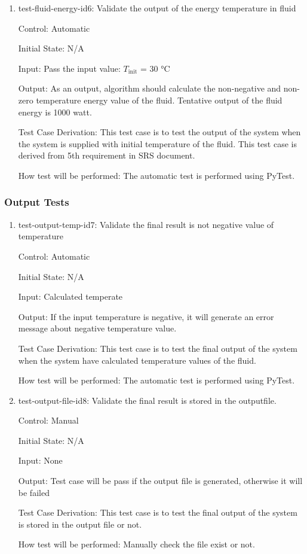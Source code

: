 \documentclass[12pt, titlepage]{article}
\begin{document}
\begin{enumerate}
\item{test-fluid-energy-id6: Validate the output of the energy temperature in fluid  \\}

Control: Automatic 
					
Initial State: N/A
					
Input: Pass the input value: $T_\text{init}$ = 30 \si[per-mode=symbol]{\celsius} 
					
Output: As an output, algorithm should calculate the non-negative and non-zero temperature energy value of the fluid. Tentative output of the fluid energy is 1000 watt.   

Test Case Derivation: This test case is to test the output of the system when the system is supplied with initial temperature of the fluid. This test case is derived from 5th requirement in SRS document.  
					
How test will be performed: The automatic test is performed using PyTest.  

\end{enumerate}   

\subsubsection{Output Tests}
\label{output_functional_tests}
\begin{enumerate}

\item{test-output-temp-id7: Validate the final result is not negative value of temperature \\}

Control: Automatic 

Initial State: N/A 

Input: Calculated temperate

Output: If the input temperature is negative, it will generate an error message about negative temperature value. 

Test Case Derivation: This test case is to test the final output of the system when the system have calculated temperature values of the fluid.

How test will be performed: The automatic test is performed using PyTest. 

\item{test-output-file-id8: Validate the final result is stored in the outputfile. \\}

Control: Manual 

Initial State: N/A 

Input: None

Output: Test case will be pass if the output file is generated, otherwise it will be failed

Test Case Derivation: This test case is to test the final output of the system is stored in the output file or not.

How test will be performed: Manually check the file exist or not. 

\end{enumerate}
\end{document}
